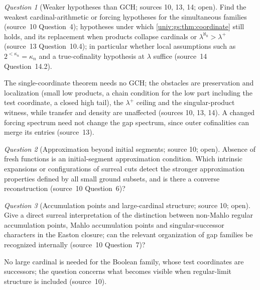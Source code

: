 \documentclass[11pt,letterpaper]{article}
\numberwithin{equation}{section}
\theoremstyle{definition}
\theoremstyle{remark}
\newtheorem{question}[question]{Question}
\begin{document}
\begin{question}[Weaker hypotheses than GCH; sources 10, 13, 14; open]\label{univ:gs:q:gch}
Find the weakest cardinal-arithmetic or forcing hypotheses for the simultaneous families
(source~10 Question~4); hypotheses under which \cref{univ:gs:thm:coordinate} still holds, and its
replacement when products collapse cardinals or $\lambda^{\aleph_0}>\lambda^+$ (source~13
Question~10.4); in particular whether local assumptions such as $2^{<\kappa_n}=\kappa_n$ and a
true-cofinality hypothesis at $\lambda$ suffice (source~14 Question~14.2).
\end{question}
The single-coordinate theorem needs no GCH; the obstacles are preservation and localization
(small low products, a chain condition for the low part including the test coordinate, a closed
high tail), the $\lambda^+$ ceiling and the singular-product witness, while transfer and density
are unaffected (sources 10, 13, 14). A changed forcing spectrum need not change the gap spectrum,
since outer cofinalities can merge its entries (source~13).

\begin{question}[Approximation beyond initial segments; source 10; open]\label{univ:gs:q:approximation}
Absence of fresh functions is an initial-segment approximation condition. Which intrinsic
expansions or configurations of surreal cuts detect the stronger approximation properties defined
by all small ground subsets, and is there a converse reconstruction (source~10 Question~6)?
\end{question}

\begin{question}[Accumulation points and large-cardinal structure; source 10; open]\label{univ:gs:q:mahlo}
Give a direct surreal interpretation of the distinction between non-Mahlo regular accumulation
points, Mahlo accumulation points and singular-successor characters in the Easton closure; can the
relevant organization of gap families be recognized internally (source~10 Question~7)?
\end{question}
No large cardinal is needed for the Boolean family, whose test coordinates are successors; the
question concerns what becomes visible when regular-limit structure is included (source~10).
\end{document}
